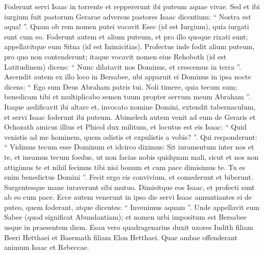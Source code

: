 \begin{biblechapter}
\begin{biblechapter}
\begin{biblechapter}
\begin{biblechapter}
\begin{biblechapter}
\begin{biblechapter}
\begin{biblechapter}
\begin{biblechapter}
\begin{biblechapter}
\begin{biblechapter}
\begin{biblechapter}
\begin{biblechapter}
\begin{biblechapter}
\begin{biblechapter}
\begin{biblechapter}
\begin{biblechapter}
\begin{biblechapter}
\begin{biblechapter}
\begin{biblechapter}
\begin{biblechapter}
\begin{biblechapter}
\begin{biblechapter}
\begin{biblechapter}
\begin{biblechapter}
\begin{biblechapter}
\begin{biblechapter}
\verse Foderunt servi Isaac in torrente et reppererunt ibi puteum aquae vivae. 
\verse Sed et ibi iurgium fuit pastorum Gerarae adversus pastores Isaac dicentium: “ Nostra est aqua! ”. Quam ob rem nomen putei vocavit Esec (id est Iurgium), quia iurgati sunt cum eo. 
\verse Foderunt autem et alium puteum, et pro illo quoque rixati sunt; appellavitque eum Sitna (id est Inimicitias). 
\verse Profectus inde fodit alium puteum, pro quo non contenderunt; itaque vocavit nomen eius Rehoboth (id est Latitudinem) dicens: “ Nunc dilatavit nos Dominus, et crescemus in terra ”.
 \verse Ascendit autem ex illo loco in Bersabee, 
\verse ubi apparuit ei Dominus in ipsa nocte dicens:
 “ Ego sum Deus Abraham patris tui.
 Noli timere, quia tecum sum;
 benedicam tibi
 et multiplicabo semen tuum
 propter servum meum Abraham ”.
 \verse Itaque aedificavit ibi altare et, invocato nomine Domini, extendit tabernaculum, et servi Isaac foderunt ibi puteum.
 \verse Abimelech autem venit ad eum de Geraris et Ochozath amicus illius et Phicol dux militum, 
\verse et locutus est eis Isaac: “ Quid venistis ad me hominem, quem odistis et expulistis a vobis? ”. 
\verse Qui responderunt: “ Vidimus tecum esse Dominum et idcirco diximus: Sit iuramentum inter nos et te, et ineamus tecum foedus, 
\verse ut non facias nobis quidquam mali, sicut et nos non attigimus te et nihil fecimus tibi nisi bonum et cum pace dimisimus te. Tu es enim benedictus Domini ”. 
\verse Fecit ergo eis convivium, et comederunt et biberunt. 
\verse Surgentesque mane iuraverunt sibi mutuo. Dimisitque eos Isaac, et profecti sunt ab eo cum pace.
 \verse Ecce autem venerunt in ipso die servi Isaac annuntiantes ei de puteo, quem foderant, atque dicentes: “ Invenimus aquam ”. 
\verse Unde appellavit eum Sabee (quod significat Abundantiam); et nomen urbi impositum est Bersabee usque in praesentem diem.
 \verse Esau vero quadragenarius duxit uxores Iudith filiam Beeri Hetthaei et Basemath filiam Elon Hetthaei. 
\verse Quae ambae offenderant animum Isaac et Rebeccae.
 

\end{biblechapter}
\end{biblechapter}
\end{biblechapter}
\end{biblechapter}
\end{biblechapter}
\end{biblechapter}
\end{biblechapter}
\end{biblechapter}
\end{biblechapter}
\end{biblechapter}
\end{biblechapter}
\end{biblechapter}
\end{biblechapter}
\end{biblechapter}
\end{biblechapter}
\end{biblechapter}
\end{biblechapter}
\end{biblechapter}
\end{biblechapter}
\end{biblechapter}
\end{biblechapter}
\end{biblechapter}
\end{biblechapter}
\end{biblechapter}
\end{biblechapter}
\end{biblechapter}
